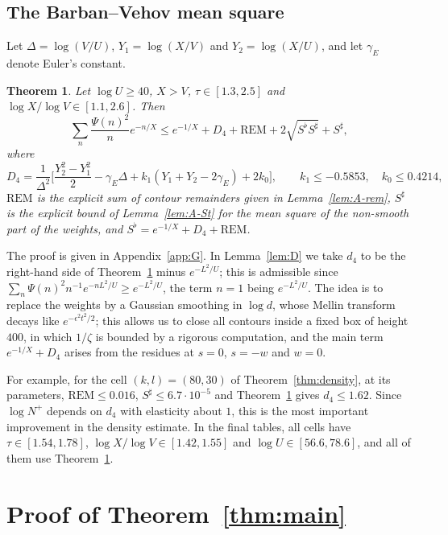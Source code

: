 \documentclass[11pt]{amsart}
\numberwithin{equation}{section}
\newtheorem{theorem}{Theorem}[section]
\theoremstyle{definition}
\theoremstyle{remark}
\begin{document}
\subsection{The Barban--Vehov mean square}

Let $\Delta = \log(V/U)$, $Y_1 = \log(X/V)$ and $Y_2 = \log(X/U)$, and let $\gamma_E$ denote Euler's constant.

\begin{theorem}\label{thm:G}
Let $\log U \geq 40$, $X > V$, $\tau \in [1.3, 2.5]$ and $\log X/\log V \in [1.1, 2.6]$.
Then
\[
\sum_n\frac{\Psi(n)^2}ne^{-n/X} \leq e^{-1/X} + D_4 + \mathrm{REM} + 2\sqrt{S^\flat S^\sharp} + S^\sharp,
\]
where
\[
D_4 = \frac{1}{\Delta^2}\Big[\frac{Y_2^2 - Y_1^2}2 - \gamma_E\Delta + k_1(Y_1 + Y_2 - 2\gamma_E) + 2k_0\Big], \qquad k_1 \leq -0.5853, \quad k_0 \leq 0.4214,
\]
$\mathrm{REM}$ is the explicit sum of contour remainders given in Lemma~\ref{lem:A-rem}, $S^\sharp$ is the explicit bound of Lemma~\ref{lem:A-St} for the mean square of the non-smooth part of the weights, and $S^\flat = e^{-1/X} + D_4 + \mathrm{REM}$.
\end{theorem}

The proof is given in Appendix~\ref{app:G}.
In Lemma~\ref{lem:D} we take $d_4$ to be the right-hand side of Theorem~\ref{thm:G} minus $e^{-L^2/U}$; this is admissible since $\sum_n\Psi(n)^2n^{-1}e^{-nL^2/U} \geq e^{-L^2/U}$, the term $n = 1$ being $e^{-L^2/U}$.
The idea is to replace the weights by a Gaussian smoothing in $\log d$, whose Mellin transform decays like $e^{-\epsilon^2t^2/2}$; this allows us to close all contours inside a fixed box of height $400$, in which $1/\zeta$ is bounded by a rigorous computation, and the main term $e^{-1/X} + D_4$ arises from the residues at $s = 0$, $s = -w$ and $w = 0$.


For example, for the cell $(k, l) = (80, 30)$ of Theorem~\ref{thm:density}, at its parameters, $\mathrm{REM} \leq 0.016$, $S^\sharp \leq 6.7\cdot10^{-5}$ and Theorem~\ref{thm:G} gives $d_4 \leq 1.62$.
Since $\log N^+$ depends on $d_4$ with elasticity about $1$, this is the most important improvement in the density estimate.
In the final tables, all cells have $\tau \in [1.54, 1.78]$, $\log X/\log V \in [1.42, 1.55]$ and $\log U \in [56.6, 78.6]$, and all of them use Theorem~\ref{thm:G}.

\section{Proof of Theorem~\ref{thm:main}}\label{sec:proof}
\end{document}
